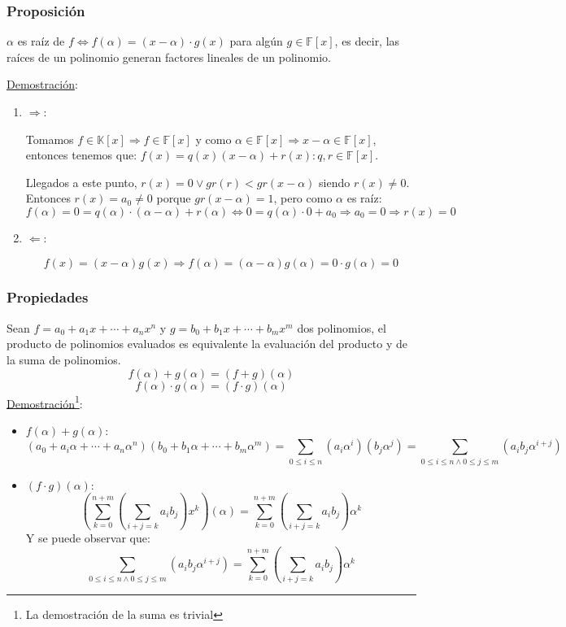 \documentclass[10pt,a4paper,openright]{book}
\theoremstyle{break}
\begin{document}
\subsubsection*{Proposición}
$\alpha$ es raíz de $f\Leftrightarrow f(\alpha)=(x-\alpha)\cdot g(x)$ para algún $g\in \mathbb F[x]$, es decir, las raíces de un polinomio generan factores lineales de un polinomio.\par
\underline{Demostración}:
\begin{enumerate}
\item $\Rightarrow$:\par
Tomamos $f\in \mathbb K[x]\Rightarrow f\in \mathbb F[x]$ y como $\alpha \in \mathbb F[x]\Rightarrow x-\alpha \in \mathbb F[x]$, entonces tenemos que: $f(x)=q(x)(x-\alpha)+r(x): q,r\in \mathbb F[x]$. \par
Llegados a este punto, $r(x)=0\vee gr(r)<gr(x-\alpha)$ siendo $r(x)\neq 0$. Entonces $r(x)=a_0\neq 0$ porque $gr(x-\alpha)=1$, pero como $\alpha$ es raíz:
$$f(\alpha)=0=q(\alpha)\cdot(\alpha-\alpha)+r(\alpha)\Leftrightarrow 0=q(\alpha)\cdot 0+ a_0\Rightarrow a_0=0\Rightarrow r(x)=0$$

\item $\Leftarrow$:\par
$$f(x)=(x-\alpha)g(x)\Rightarrow f(\alpha)=(\alpha-\alpha)g(\alpha)=0\cdot g(\alpha)=0$$
\end{enumerate}

\subsubsection*{Propiedades}
Sean $f=a_0+a_1x+\cdots+a_nx^n$ y $g=b_0+b_1x+\cdots+b_mx^m$ dos polinomios, el producto de polinomios evaluados es equivalente la evaluación del producto y de la suma de polinomios.
$$f(\alpha)+g(\alpha)=(f+g)(\alpha)$$
$$f(\alpha)\cdot g(\alpha)=(f\cdot g)(\alpha)$$ 
\underline{Demostración}\footnote{La demostración de la suma es trivial}:
\begin{itemize}
\item $f(\alpha)+g(\alpha)$:
$$(a_0+a_i\alpha +\cdots+a_n\alpha ^n)(b_0+b_1\alpha +\cdots+b_m\alpha ^m)=\sum_{0\leq i \leq n} (a_i\alpha ^i)(b_j\alpha ^j)=\sum_{0\leq i \leq n\wedge 0\leq j\leq m} (a_ib_j\alpha^{i+j})$$

\item $(f\cdot g)(\alpha)$:
$$\left(\sum_{k=0}^{n+m}\left(\sum_{i+j=k} a_ib_j\right)x^k\right)(\alpha)=\sum_{k=0}^{n+m}\left(\sum_{i+j=k} a_ib_j\right)\alpha^k$$
Y se puede observar que:
$$\sum_{0\leq i \leq n\wedge 0\leq j\leq m} (a_ib_j\alpha^{i+j})=\sum_{k=0}^{n+m}\left(\sum_{i+j=k} a_ib_j\right)\alpha^k$$
\end{itemize}
\end{document}
